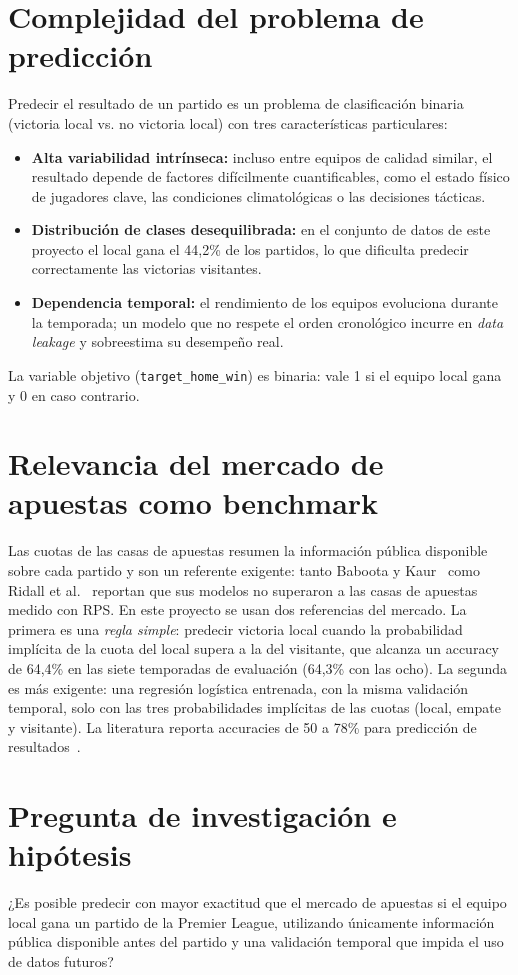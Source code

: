 \documentclass[12pt,letterpaper,oneside]{report}
\begin{document}
\section{Complejidad del problema de predicción}
Predecir el resultado de un partido es un problema de clasificación binaria (victoria local vs. no victoria local) con tres características particulares:
\begin{itemize}
\item \textbf{Alta variabilidad intrínseca:} incluso entre equipos de calidad similar, el resultado depende de factores difícilmente cuantificables, como el estado físico de jugadores clave, las condiciones climatológicas o las decisiones tácticas.
\item \textbf{Distribución de clases desequilibrada:} en el conjunto de datos de este proyecto el local gana el 44,2\% de los partidos, lo que dificulta predecir correctamente las victorias visitantes.
\item \textbf{Dependencia temporal:} el rendimiento de los equipos evoluciona durante la temporada; un modelo que no respete el orden cronológico incurre en \textit{data leakage} y sobreestima su desempeño real.
\end{itemize}
La variable objetivo (\texttt{target\_home\_win}) es binaria: vale 1 si el equipo local gana y 0 en caso contrario.

\section{Relevancia del mercado de apuestas como benchmark}
Las cuotas de las casas de apuestas resumen la información pública disponible sobre cada partido y son un referente exigente: tanto Baboota y Kaur~\cite{baboota2019predictive} como Ridall et al.~\cite{ridall2025bayesian} reportan que sus modelos no superaron a las casas de apuestas medido con RPS. En este proyecto se usan dos referencias del mercado. La primera es una \textit{regla simple}: predecir victoria local cuando la probabilidad implícita de la cuota del local supera a la del visitante, que alcanza un accuracy de 64,4\% en las siete temporadas de evaluación (64,3\% con las ocho). La segunda es más exigente: una regresión logística entrenada, con la misma validación temporal, solo con las tres probabilidades implícitas de las cuotas (local, empate y visitante). La literatura reporta accuracies de 50 a 78\% para predicción de resultados~\cite{ricogonzalez2023ml}.

\section{Pregunta de investigación e hipótesis}
\label{sec:pregunta}
¿Es posible predecir con mayor exactitud que el mercado de apuestas si el equipo local gana un partido de la Premier League, utilizando únicamente información pública disponible antes del partido y una validación temporal que impida el uso de datos futuros?
\end{document}
